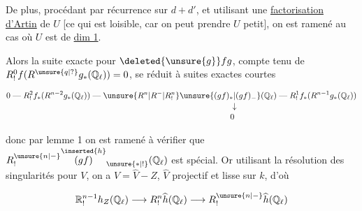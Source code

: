 
De plus, procédant par récurrence sur $d+d'$, et utilisant une \uline{factorisation d'Artin} de $U$ [ce qui est loisible, car on peut prendre $U$ petit], on est ramené au cas où $U$ est de \uline{dim 1}.

Alors la suite exacte pour $\deleted{\unsure{g}}fg$,  compte tenu de $R^0_!f(R^{\unsure{q|?}} g_*(\mathbb Q_\ell))=0$, se réduit à  suites exactes courtes

\[
\begin{aligned}
0\mathrel{\text{---}}R^2_!f_*(R^{n-2}g_*(\mathbb Q_\ell))&\mathrel{\text{---}}\unsure{R^n|R^-|R^n_!}\unsure{(gf)_*|(gf)_{-}}(\mathbb Q_\ell)\mathrel{\text{---}}R^1_! f_*(R^{n-1}g_*(\mathbb Q_\ell))\\[-2pt]
&\hspace{17em}\downarrow\\[-2pt]&\hspace{17em}0
\end{aligned}
\]

donc par lemme 1 on est ramené à vérifier que $R^{\unsure{n|-}}_!\overset{\inserted{h}}{(gf)}_{\unsure{*|!}}(\mathbb Q_\ell)$ est spécial. Or utilisant la résolution des singularités pour $V$, on a $V=\widehat V-Z$, $\widehat V$ projectif et lisse sur $k$, d'où

\[ \mathbb R^{n-1}_! h_Z(\mathbb Q_\ell)\longrightarrow R^n_!\widehat h(\mathbb Q_\ell)\longrightarrow R^{\unsure{n|-}}_!\widehat h(\mathbb Q_\ell) \]

